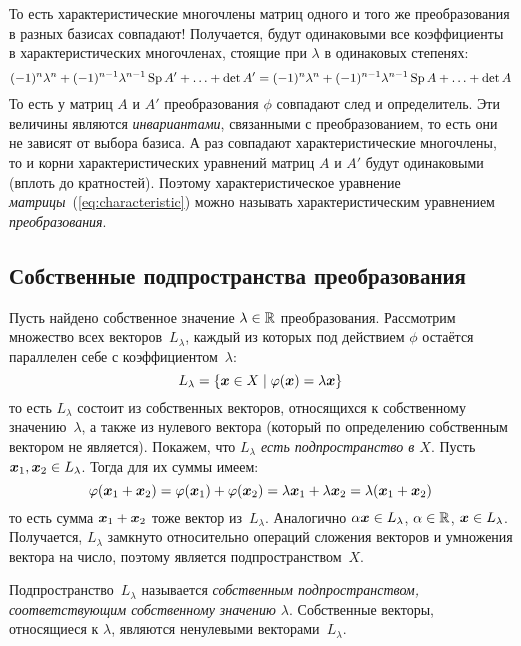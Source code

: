 \documentclass[a4paper,12pt]{article}
\begin{document}
  То есть характеристические многочлены матриц одного и того же преобразования в разных базисах совпадают!
  Получается, будут одинаковыми все коэффициенты в характеристических многочленах, стоящие при $\lambda$ в одинаковых степенях:
  \begin{equation*}
    (-1)^n \lambda^n + (-1)^{n-1} \lambda^{n-1} \operatorname{Sp} A' + \ldots + \det A'
      = (-1)^n \lambda^n + (-1)^{n-1} \lambda^{n-1} \operatorname{Sp} A + \ldots + \det A
  \end{equation*}
  То есть у матриц $A$ и $A'$ преобразования $\phi$ совпадают след и определитель.
  Эти величины являются \emph{инвариантами}, связанными с преобразованием, то есть они не зависят от выбора базиса.
  А раз совпадают характеристические многочлены, то и корни характеристических уравнений матриц $A$ и $A'$ будут одинаковыми (вплоть до кратностей).
  Поэтому характеристическое уравнение \emph{матрицы}~(\ref{eq:characteristic}) можно называть характеристическим уравнением \emph{преобразования}.
  
  
  \subsection{Собственные подпространства преобразования}
  
  Пусть найдено собственное значение $\lambda \hm\in \RR$ преобразования.
  Рассмотрим множество всех векторов~$L_{\lambda}$, каждый из которых под действием $\phi$ остаётся параллелен себе с коэффициентом~$\lambda$:
  \begin{equation}\label{eq:proper-subspace}
    L_{\lambda} = \{\boldsymbol x \in X \mid \varphi(\boldsymbol x) = \lambda \boldsymbol x\}
  \end{equation}
  то есть $L_{\lambda}$ состоит из собственных векторов, относящихся к собственному значению~$\lambda$, а также из нулевого вектора (который по определению собственным вектором не является).
  Покажем, что \emph{$L_{\lambda}$ есть подпространство в $X$}.
  Пусть $\bds x_1, \bds x_2 \hm\in L_{\lambda}$.
  Тогда для их суммы имеем:
  \[
    \varphi(\boldsymbol x_1 + \boldsymbol x_2) = \varphi(\boldsymbol x_1) + \varphi(\boldsymbol x_2) = \lambda \boldsymbol x_1 + \lambda \boldsymbol x_2 = \lambda (\boldsymbol x_1 + \boldsymbol x_2)
  \]
  то есть сумма $\bds x_1 \hm+ \bds x_2$ тоже вектор из~$L_{\lambda}$.
  Аналогично $\alpha \bds x \hm\in L_{\lambda}$, $\alpha \hm\in \RR$, $\bds x \hm\in L_{\lambda}$.
  Получается, $L_{\lambda}$ замкнуто относительно операций сложения векторов и умножения вектора на число, поэтому является подпространством~$X$.
  
  Подпространство~$L_{\lambda}$ называется \emph{собственным подпространством, соответствующим собственному значению $\lambda$}.
  Собственные векторы, относящиеся к $\lambda$, являются ненулевыми векторами~$L_{\lambda}$.
  
\end{document}

